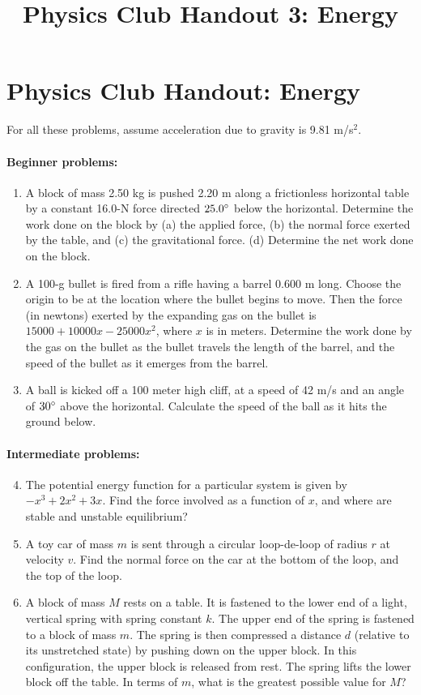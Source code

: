 \documentclass[12pt,letterpaper]{article}
\title{Physics Club Handout 3: Energy}
\begin{document}
\section{Physics Club Handout: Energy}
\vspace{-10pt}
For all these problems, assume acceleration due to gravity is 9.81 m\slash s$^2$.
\vspace{-20pt}
\paragraph{Beginner problems:}
\begin{enumerate}
\item
A block of mass 2.50 kg is pushed 2.20 m along a frictionless horizontal table by a constant 16.0-N force directed $25.0\degree$ below the horizontal. Determine the work done on the block by (a) the applied force, (b) the normal force exerted by the table, and (c) the gravitational force. (d) Determine the net work done on the block.

\item
A 100-g bullet is fired from a rifle having a barrel 0.600 m long. Choose the origin to be at the location where the bullet begins to move. Then the force (in newtons) exerted by the expanding gas on the bullet is $15000+10000x-25000x^2$, where  $x$ is in meters. Determine the work done by the gas on the bullet as the bullet travels the length of the barrel, and the speed of the bullet as it emerges from the barrel.

\item
{A ball is kicked off a 100 meter high cliff, at a speed of 42 m\slash s and an angle of $30\degree$ above the horizontal. Calculate the speed of the ball as it hits the ground below.}
\end{enumerate}
\vspace{-20pt}
\paragraph{Intermediate problems:}
\begin{enumerate}
\setcounter{enumi}{3}
\item
The potential energy function for a particular system is given by $-x^3+2x^2+3x$. Find the force involved as a function of $x$, and where are stable and unstable equilibrium?

\item
A toy car of mass $m$ is sent through a circular loop-de-loop of radius $r$ at velocity $v$. Find the normal force on the car at the bottom of the loop, and the top of the loop.

\item
A block of mass $M$ rests on a table. It is fastened to the lower end of a light, vertical spring with spring constant $k$. The upper end of the spring is fastened to a block of mass $m$. The spring is then compressed a distance $d$ (relative to its unstretched state) by pushing down on the upper block. In this configuration, the upper block is released from rest. The spring lifts the lower block off the table. In terms of $m$, what is the greatest possible value for $M$?
\end{enumerate}
\vspace{-20pt}
\end{document}
